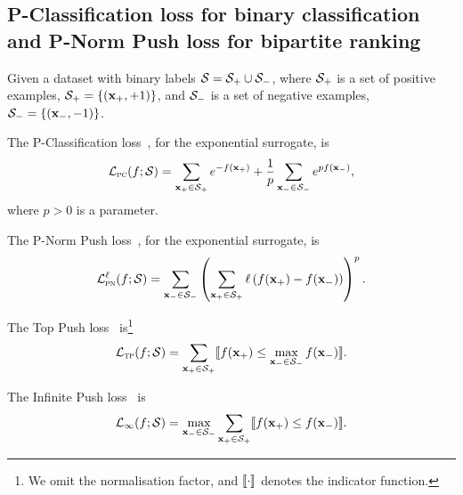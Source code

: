 \subsection{P-Classification loss for binary classification and P-Norm Push loss for bipartite ranking}
\label{sec:binary}

Given a dataset with binary labels $\mathcal{S} = \mathcal{S}_+ \cup \mathcal{S}_-$, where $\mathcal{S}_+$ is a set of positive examples, 
\ie $\mathcal{S}_+ = \{(\mathbf{x}_+, +1)\}$, and $\mathcal{S}_-$ is a set of negative examples, \ie $\mathcal{S}_- = \{(\mathbf{x}_-, -1)\}$.

The P-Classification loss~\cite{ertekin2011equivalence}, for the exponential surrogate, is
\begin{equation*}
\mathcal{L}_\textsc{pc}(f; \mathcal{S}) 
= \sum_{\mathbf{x}_+ \in \mathcal{S}_+} e^{-f(\mathbf{x}_+)} + \frac{1}{p} \sum_{\mathbf{x}_- \in \mathcal{S}_-} e^{p f(\mathbf{x}_-)},
\end{equation*}
where $p > 0$ is a parameter.

The P-Norm Push loss~\cite{rudin2009p}, for the exponential surrogate, is
\begin{equation*}
\mathcal{L}_\textsc{pn}^\ell (f; \mathcal{S})
= \sum_{\mathbf{x}_- \in \mathcal{S}_-} \left( \sum_{\mathbf{x}_+ \in \mathcal{S}_+} \ell \left( f(\mathbf{x}_+) - f(\mathbf{x}_-) \right) \right)^p.
\end{equation*}

The Top Push loss~\cite{li2014top} is\footnote{We omit the normalisation factor, and $\llbracket \cdot \rrbracket$ denotes the indicator function.}
\begin{equation*}
\mathcal{L}_\textsc{tp}(f; \mathcal{S})
= \sum_{\mathbf{x}_+ \in \mathcal{S}_+} \llbracket f(\mathbf{x}_+) \le \max_{\mathbf{x}_- \in \mathcal{S}_-} f(\mathbf{x}_-) \rrbracket.
\end{equation*}

The Infinite Push loss~\cite{rudin2009p} is
\begin{equation*}
\mathcal{L}_\infty(f; \mathcal{S})
= \max_{\mathbf{x}_- \in \mathcal{S}_-} \sum_{\mathbf{x}_+ \in \mathcal{S}_+} \llbracket f(\mathbf{x}_+) \le f(\mathbf{x}_-) \rrbracket.
\end{equation*}


